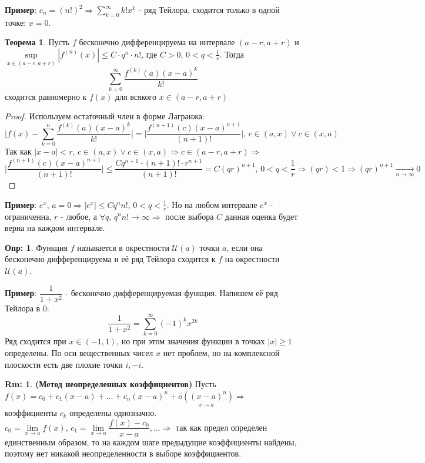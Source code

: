 \documentclass[12pt]{article}
\newcommand{\MU}{\mathcal{U}}
\theoremstyle{definition}
\newtheorem{defn}{Опр:}
\newtheorem{rem}{Rm:}
\newtheorem{theorem}{Теорема}
\begin{document}
\textbf{Пример}: $c_n = (n!)^2 \Rightarrow \displaystyle \sum\limits_{k = 0}^{\infty}k!x^k$ - ряд Тейлора, сходится только в одной точке: $x = 0$.

\begin{theorem}
	Пусть $f$ бесконечно дифференцируема на интервале $(a-r,a+r)$ и \\
	$\sup\limits_{x \in (a-r,a+r)}|f^{(n)}(x)| \leq C{\cdot}q^n{\cdot}n!$, где $C >0, \, 0 < q < \frac{1}{r}$. Тогда $$\displaystyle \sum\limits_{k = 0}^{\infty} \dfrac{f^{(k)}(a)(x-a)^k}{k!}$$ сходится равномерно к $f(x)$ для всякого $x \in (a - r, a + r)$ 
\end{theorem}
\begin{proof}
	Используем остаточный член в форме Лагранжа:
	$$\bigg|f(x) - \sum\limits_{k = 0}^{n} \dfrac{f^{(k)}(a)(x-a)^k}{k!} \bigg| = \bigg|\dfrac{f^{(n+1)}(c)(x-a)^{n+1}}{(n+1)!} \bigg|, \, c \in (a,x) \vee c \in (x,a)$$
	Так как $|x - a| < r, \, c \in (a,x) \vee c \in (x,a) \Rightarrow c \in (a-r, a+r) \Rightarrow$
	$$\bigg|\dfrac{f^{(n+1)}(c)(x-a)^{n+1}}{(n+1)!} \bigg| \leq \dfrac{Cq^{n+1}{\cdot}(n+1)!{\cdot}r^{n+1}}{(n+1)!} = C(qr)^{n+1}, \, 0 < q < \frac{1}{r} \Rightarrow (qr) < 1 \Rightarrow (qr)^{n+1} \xrightarrow[n \to \infty]{} 0$$
\end{proof}

\textbf{Пример}: $e^x, \, a = 0 \Rightarrow |e^x| \leq Cq^n n!,\, 0 < q < \frac{1}{r} $. Но на любом интервале $e^x$ - ограниченна, $r$ - любое, а $\forall q, \, q^n n! \to \infty \Rightarrow$ после выбора $C$ данная оценка будет верна на каждом интервале. 

\begin{defn}
	Функция $f$ называется  в окрестности $\MU(a)$ точки $a$, если она бесконечно дифференцируема и её ряд Тейлора сходится к $f$ на окрестности $\MU(a)$.
\end{defn}

\textbf{Пример}: $\dfrac{1}{1+x^2}$ - бесконечно дифференцируемая функция. Напишем её ряд Тейлора в $0$: 
$$\dfrac{1}{1+x^2} = \displaystyle \sum\limits_{k=0}^{\infty}(-1)^k x^{2k}$$
Ряд сходится при $x \in (-1,1)$, но при этом значения функции в точках $|x| \geq 1$ определены. По оси вещественных чисел $x$ нет проблем, но на комплексной плоскости есть две плохие точки $i,-i$.

\begin{rem} \textbf{(Метод неопределенных коэффициентов)}
	Пусть $f(x) = c_0 + c_1(x-a) + \dotsc + c_n(x-a)^n + \underset{x \to a}{\bar{o}((x-a)^n)} \Rightarrow$ коэффициенты $c_k$ определены однозначно. $c_0 = \lim\limits_{x \to a} f(x), \, c_1 = \lim\limits_{x \to a} \dfrac{f(x) - c_0}{x-a}, \dotsc \Rightarrow$ так как предел определен единственным образом, то на каждом шаге предыдущие коэффициенты найдены, поэтому нет никакой неопределенности в выборе коэффициентов.
\end{rem}
\end{document}
